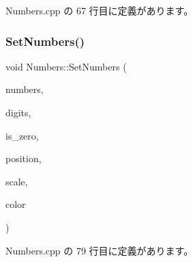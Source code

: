  Numbers.\+cpp の 67 行目に定義があります。

\mbox{\label{class_numbers_aeb51ecf4e148f4ca67ac7788e061f94d}} 
\subsubsection{\texorpdfstring{Set\+Numbers()}{SetNumbers()}}
{\footnotesize\ttfamily void Numbers\+::\+Set\+Numbers (\begin{DoxyParamCaption}\item[{int}]{numbers,  }\item[{int}]{digits,  }\item[{bool}]{is\+\_\+zero,  }\item[{\mbox{\hyperlink{_vector3_d_8h_a5ef6e95dfc5f9d3820b71772d99bbc25}{Vec2}}}]{position,  }\item[{\mbox{\hyperlink{_vector3_d_8h_a5ef6e95dfc5f9d3820b71772d99bbc25}{Vec2}}}]{scale,  }\item[{\mbox{\hyperlink{_vector3_d_8h_a680c30c4a07d86fe763c7e01169cd6cc}{X\+Color4}}}]{color }\end{DoxyParamCaption})}



 Numbers.\+cpp の 79 行目に定義があります。

